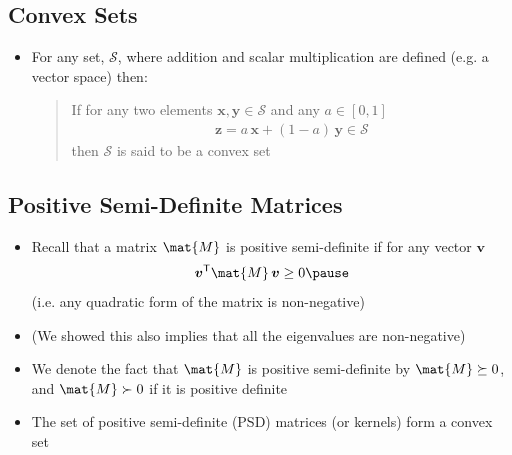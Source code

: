 
\begin{slide}
\section{Convex Sets}

\begin{PauseHighLight}
  \begin{itemize}
  \item For any set, $\mathcal{S}$, where addition and scalar
    multiplication are defined (e.g. a vector space) then:
    \begin{quotation}
      \noindent If for any two elements $\bm{x},\bm{y} \in \mathcal{S}$ and any
      $a\in[0,1]$
      \begin{align*}
        \bm{z} = a\,\bm{x} + (1-a)\,\bm{y} \in \mathcal{S}
      \end{align*}
      then $\mathcal{S}$ is said to be a convex set\pause
    \end{quotation}
  \end{itemize}
\end{PauseHighLight}

\end{slide}


\begin{slide}
\section[-2]{Positive Semi-Definite Matrices}

\begin{PauseHighLight}
  \begin{itemize}
  \item Recall that a matrix $\mat{M}$ is positive semi-definite if for any
    vector $\bm{v}$
    \begin{align*}
      \bm{v}^\tr \mat{M}\,\bm{v} \geq 0\pause
    \end{align*}
    (i.e.{} any quadratic form of the matrix is non-negative)\pauseb
  \item (We showed this also implies that all the eigenvalues are
    non-negative)\pause
  \item We denote the fact that $\mat{M}$ is positive semi-definite by
    $\mat{M}\succeq0$, and $\mat{M} \succ 0$ if it is positive definite\pause
  \item The set of positive semi-definite (PSD) matrices (or kernels) form a
    convex set\pause
  \end{itemize}
\end{PauseHighLight}


\end{slide}

